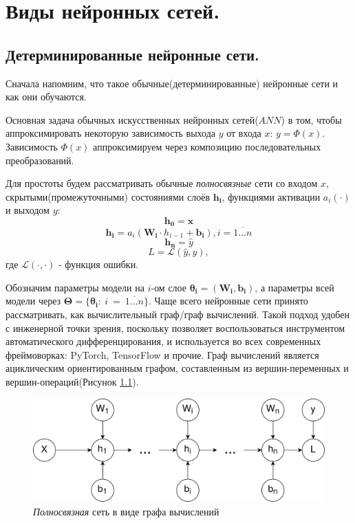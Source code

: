 \documentclass[14pt]{report}
\begin{document}
\chapter{Виды нейронных сетей.}

\section{Детерминированные нейронные сети.}

Сначала напомним, что такое обычные(детерминированные) нейронные сети и как они обучаются.

Основная задача обычных искусственных нейронных сетей($ANN$) в том, чтобы аппроксимировать некоторую зависимость выхода $y$ от
 входа $x$: $y = \Phi(x)$. Зависимость $\Phi(x)$ аппроксимируем через композицию последовательных преобразований.

Для простоты будем рассматривать обычные \textit{полносвязные} сети со входом $x$,
 скрытыми(промежуточными) состояниями слоёв $\bm{h_i}$, функциями активации $a_i(\cdot)$ и выходом $y$:
$$\bm{h_0} = \bm{x}$$
$$\bm{h_i} = a_i(\bm{W_i} \cdot h_{i-1} + \bm{b_i}), i = \overline{1...n}$$
$$\bm{h_n} = \widehat{y}$$
$$L = \mathcal{L}(\widehat{y}, y),$$ где $\mathcal{L}(\cdot, \cdot)$ - функция ошибки.

Обозначим параметры модели на $i$-ом слое $\bm{\theta_i} = (\bm{W_i}, \bm{b_i})$, а параметры всей модели через $\bm{\Theta} = \{\bm{\theta_i} :~i~=~\overline{1...n}\}$.
Чаще всего нейронные сети принято рассматривать, как вычислительный граф/граф вычислений.
 Такой подход удобен с инженерной точки зрения, поскольку позволяет воспользоваться инструментом автоматического
 дифференцирования, и используется во всех современных фреймоворках: PyTorch, TensorFlow и прочие.
 Граф вычислений является ациклическим ориентированным графом, составленным из вершин-переменных и вершин-операций(Рисунок \ref{fig:image1}).
\begin{figure}[H]
    \centering
    \includegraphics[width=0.7\linewidth]{ANN.png}
    \caption{\textit{Полносвязная} сеть в виде графа вычислений}
    \label{fig:image1}
\end{figure}
\end{document}

